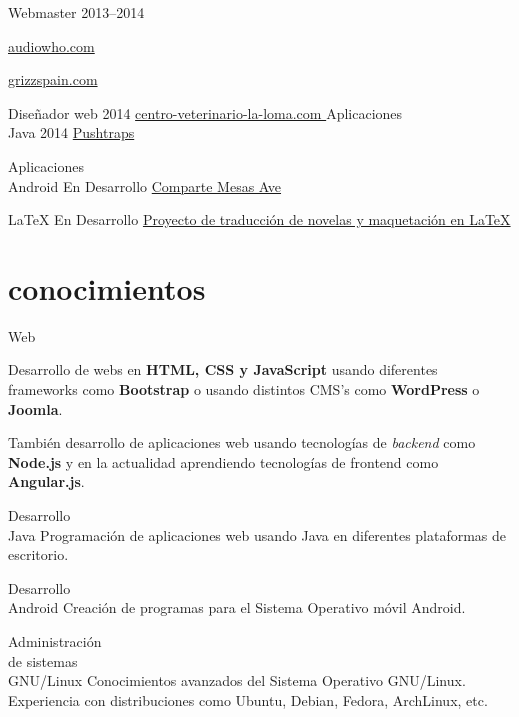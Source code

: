 \documentclass[hidelinks]{friggeri-cv} %
\begin{document}
\begin{entrylist}
\entry
{Webmaster}
{}
{2013--2014}
{
\href{http://bit.ly/1EkBjUB}{audiowho.com \hspace{0.5em} \faLink}

\href{http://bit.ly/1EJiCHz}{grizzspain.com \hspace{0.5em} \faLink}
}
\entry
{Diseñador web}
{}
{2014}
{
\href{http://bit.ly/1JqdhYn}{centro-veterinario-la-loma.com \hspace{0.5em} \faLink}
}
\entry
{Aplicaciones \\ Java}
{}
{2014}
{
\href{http://bit.ly/18gBD9M}{Pushtraps \hspace{0.5em} \faLink}
}

\entry
{Aplicaciones \\ Android}
{}
{En Desarrollo}
{
\href{http://bit.ly/18gBdjQ}{Comparte Mesas Ave \hspace{0.5em} \faLink}
}

\entry
{\LaTeX}
{}
{En Desarrollo}
{
\href{http://bit.ly/1C2wIWs}{Proyecto de traducción de novelas y
maquetación en \LaTeX \hspace{0.5em} \faLink} 
}

\end{entrylist}


\section{conocimientos}

\begin{entrylist}
\entry
{Web}
{}
{}
{Desarrollo de webs en \textbf{HTML, CSS y JavaScript} usando diferentes frameworks como
\textbf{Bootstrap} o usando distintos CMS's como \textbf{WordPress} o \textbf{Joomla}.

También desarrollo de aplicaciones web usando tecnologías de \emph{backend} como
\textbf{Node.js} y en la actualidad aprendiendo tecnologías de frontend como
\textbf{Angular.js}.
}

\entry
{Desarrollo \\ Java}
{}
{}
{Programación de aplicaciones web usando Java en diferentes plataformas de escritorio.}

\entry
{Desarrollo \\ Android}
{}
{}
{Creación de programas para el Sistema Operativo móvil Android.}

\entry
{Administración \\ de sistemas \\ GNU/Linux}
{}
{}
{Conocimientos avanzados del Sistema Operativo GNU/Linux. Experiencia con 
distribuciones como Ubuntu, Debian, Fedora, ArchLinux, etc.}
\end{entrylist}
\end{document}
